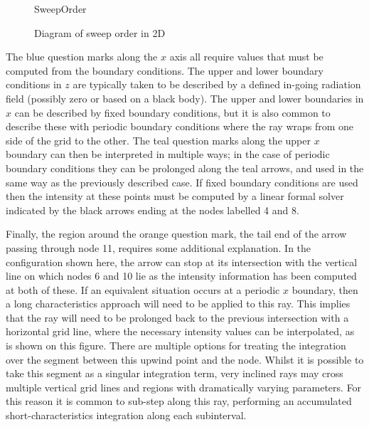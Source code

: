 \begin{figure}
\centering
{SweepOrder}
\caption{Diagram of sweep order in 2D}
\label{Fig:2DSweep}
\end{figure}

The {\color{TolBlue} blue} question marks along the $x$ axis all require values that must be computed from the boundary conditions.
The upper and lower boundary conditions in $z$ are typically taken to be described by a defined in-going radiation field (possibly zero or based on a black body).
The upper and lower boundaries in $x$ can be described by fixed boundary conditions, but it is also common to describe these with periodic boundary conditions where the ray wraps from one side of the grid to the other.
The {\color{TolTeal} teal} question marks along the upper $x$ boundary can then be interpreted in multiple ways; in the case of periodic boundary conditions they can be prolonged along the {\color{TolTeal} teal} arrows, and used in the same way as the previously described case.
If fixed boundary conditions are used then the intensity at these points must be computed by a linear formal solver indicated by the black arrows ending at the nodes labelled 4 and 8.

Finally, the region around the {\color{TolOrange} orange} question mark, the tail end of the arrow passing through node 11, requires some additional explanation.
In the configuration shown here, the arrow can stop at its intersection with the vertical line on which nodes 6 and 10 lie as the intensity information has been computed at both of these.
If an equivalent situation occurs at a periodic $x$ boundary, then a long characteristics approach will need to be applied to this ray.
This implies that the ray will need to be prolonged back to the previous intersection with a horizontal grid line, where the necessary intensity values can be interpolated, as is shown on this figure.
There are multiple options for treating the integration over the segment between this upwind point and the node.
Whilst it is possible to take this segment as a singular integration term, very inclined rays may cross multiple vertical grid lines and regions with dramatically varying parameters.
For this reason it is common to sub-step along this ray, performing an accumulated short-characteristics integration along each subinterval.

